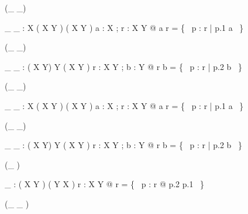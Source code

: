 \begin{zed}
 \rightassoc (\_ \dres \_)
\end{zed}

\begin{gendef}[X,Y]
\_ \dres \_ : \power X \cross ( X \rel Y ) \fun ( X \rel Y )
\where
\forall a : \power X ; r : X \rel Y @ a \dres r = \{~ p : r | p.1 \in a ~\}
\end{gendef}

\begin{zed}
 \leftassoc (\_ \rres \_)
\end{zed}

\begin{gendef}[X,Y]
\_ \rres \_ : ( X \rel Y) \cross \power Y \fun ( X \rel Y )
\where
\forall r : X \rel Y ; b : \power Y @ r \rres b = \{~ p : r | p.2 \in b ~\}
\end{gendef}

\begin{zed}
 \rightassoc (\_ \ndres \_)
\end{zed}

\begin{gendef}[X,Y]
\_ \ndres \_ : \power X \cross ( X \rel Y ) \fun ( X \rel Y )
\where
\forall a : \power X ; r : X \rel Y @ a \ndres r = \{~ p : r | p.1 \notin a ~\}
\end{gendef}

\begin{zed}
 \leftassoc (\_ \nrres \_)
\end{zed}

\begin{gendef}[X,Y]
\_ \nrres \_ : ( X \rel Y) \cross \power Y \fun ( X \rel Y )
\where
\forall r : X \rel Y ; b : \power Y @
r \nrres b = \{~ p : r | p.2 \notin b ~\}
\end{gendef}

\begin{zed}
\function (\_ \inv)
\end{zed}

\begin{gendef}[X,Y]
\_ \inv : ( X \rel Y ) \fun ( Y \rel X )
\where
\forall r : X \rel Y @ r \inv = \{~ p : r @ p.2 \mapsto p.1 ~\}
\end{gendef}

\begin{zed}
\function (\_ \limg \_ \rimg)
\end{zed}

